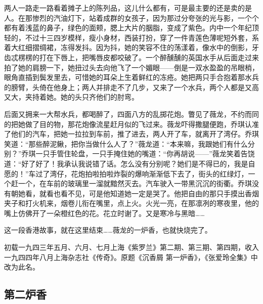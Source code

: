 \par 两人一路走一路看着摊子上的陈列品，这儿什么都有，可是最主要的还是卖的是人。在那惨烈的汽油灯下，站着成群的女孩子，因为那过分夸张的光与影，一个个都有着浅蓝的鼻子，绿色的面颊，腮上大片的胭脂，变成了紫色。内中一个年纪顶轻的，不过十三四岁模样，瘦小身材，西装打扮，穿了一件青莲色薄呢短外套，系着大红细摺绸裙，冻得发抖。因为抖，她的笑容不住的荡漾着，像水中的倒影，牙齿忒楞楞的打在下唇上，把嘴唇皮都咬破了。一个醉醺醺的英国水手从后面走过来拍了她的肩膀一下，她扭过头去向他飞了一个媚眼——倒是一双水盈盈的吊眼梢，眼角直插到鬓发里去，可惜她的耳朵上生着鲜红的冻疮。她把两只手合抱着那水兵的膀臂，头倚在他身上；两人并排走不了几步，又来了一个水兵，两个人都是又高又大，夹持着她。她的头只齐他们的肘弯。
\par 后面又拥来一大帮水兵，都喝醉了，四面八方的乱掷花炮。瞥见了薇龙，不约而同的把她做了目的物，那花炮像流星赶月似的飞过来。薇龙吓得撒腿便跑，乔琪认准了他们的汽车，把她一拉拉到车前，推了进去，两人开了车，就离开了湾仔。乔琪笑道：“那些醉泥鳅，把你当做什么人了？”薇龙道：“本来嘛，我跟她们有什么分别？”乔琪一只手管住轮盘，一只手掩住她的嘴道：“你再胡说——”薇龙笑着告饶道：“好了好了！我承认我说错了话。怎么没有分别呢？她们是不得已的，我是自愿的！”车过了湾仔，花炮拍啦拍啦炸裂的爆响渐渐低下去了，街头的红绿灯，一个赶一个，在车前的玻璃里一溜就黯然灭去。汽车驶入一带黑沉沉的街衢。乔琪没有朝她看，就看也看不见，可是他知道她一定是哭了。他把自由的那只手摸出香烟夹子和打火机来，烟卷儿衔在嘴里，点上火。火光一亮，在那凛冽的寒夜里，他的嘴上仿佛开了一朵橙红色的花。花立时谢了。又是寒冷与黑暗……
\par 这一段香港故事，就在这里结束……薇龙的一炉香，也就快烧完了。
\par {}
\par *初载一九四三年五月、六月、七月上海《紫罗兰》第二期、第三期、第四期，收入一九四四年八月上海杂志社《传奇》。原题《沉香屑 第一炉香》，《张爱玲全集》中改为此名。


\subsection{第二炉香}

